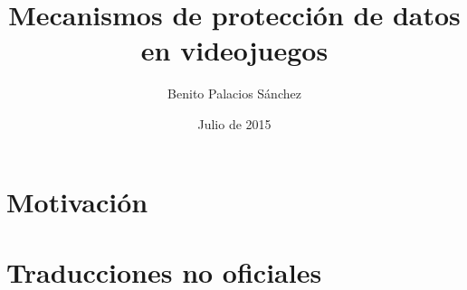 \documentclass{beamer}
\title{Mecanismos de protección de datos en videojuegos}
\author{Benito Palacios Sánchez}
\institute
{Escuela Técnica Superior de Ingenierías Informática y Telecomunicación\\
  Universidad de Granada
}
\date{Julio de 2015}
\begin{document}
    \frame{\titlepage}


    \section{Motivación}

    \section{Traducciones no oficiales}
\end{document}
